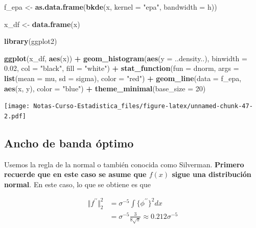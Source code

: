 \documentclass[
  12pt,
]{book}
\newenvironment{Shaded}{\begin{snugshade}}{\end{snugshade}}
\newcommand{\DataTypeTok}[1]{\textcolor[rgb]{0.13,0.29,0.53}{#1}}
\newcommand{\DecValTok}[1]{\textcolor[rgb]{0.00,0.00,0.81}{#1}}
\newcommand{\FloatTok}[1]{\textcolor[rgb]{0.00,0.00,0.81}{#1}}
\newcommand{\KeywordTok}[1]{\textcolor[rgb]{0.13,0.29,0.53}{\textbf{#1}}}
\newcommand{\NormalTok}[1]{#1}
\newcommand{\OperatorTok}[1]{\textcolor[rgb]{0.81,0.36,0.00}{\textbf{#1}}}
\newcommand{\StringTok}[1]{\textcolor[rgb]{0.31,0.60,0.02}{#1}}
\theoremstyle{definition}
\theoremstyle{definition}
\theoremstyle{definition}
\theoremstyle{remark}
\begin{document}
\begin{Shaded}
\begin{Highlighting}[]
\NormalTok{f_epa <-}\StringTok{ }\KeywordTok{as.data.frame}\NormalTok{(}\KeywordTok{bkde}\NormalTok{(x, }\DataTypeTok{kernel =} \StringTok{"epa"}\NormalTok{, }\DataTypeTok{bandwidth =}\NormalTok{ h))}

\NormalTok{x_df <-}\StringTok{ }\KeywordTok{data.frame}\NormalTok{(x)}

\KeywordTok{library}\NormalTok{(ggplot2)}

\KeywordTok{ggplot}\NormalTok{(x_df, }\KeywordTok{aes}\NormalTok{(x)) }\OperatorTok{+}\StringTok{ }\KeywordTok{geom_histogram}\NormalTok{(}\KeywordTok{aes}\NormalTok{(}\DataTypeTok{y =}\NormalTok{ ..density..), }
    \DataTypeTok{binwidth =} \FloatTok{0.02}\NormalTok{, }\DataTypeTok{col =} \StringTok{"black"}\NormalTok{, }\DataTypeTok{fill =} \StringTok{"white"}\NormalTok{) }\OperatorTok{+}\StringTok{ }
\StringTok{    }\KeywordTok{stat_function}\NormalTok{(}\DataTypeTok{fun =}\NormalTok{ dnorm, }\DataTypeTok{args =} \KeywordTok{list}\NormalTok{(}\DataTypeTok{mean =}\NormalTok{ mu, }
        \DataTypeTok{sd =}\NormalTok{ sigma), }\DataTypeTok{color =} \StringTok{"red"}\NormalTok{) }\OperatorTok{+}\StringTok{ }\KeywordTok{geom_line}\NormalTok{(}\DataTypeTok{data =}\NormalTok{ f_epa, }
    \KeywordTok{aes}\NormalTok{(x, y), }\DataTypeTok{color =} \StringTok{"blue"}\NormalTok{) }\OperatorTok{+}\StringTok{ }\KeywordTok{theme_minimal}\NormalTok{(}\DataTypeTok{base_size =} \DecValTok{20}\NormalTok{)}
\end{Highlighting}
\end{Shaded}

\texttt{[image: Notas-Curso-Estadistica\_files/figure-latex/unnamed-chunk-47-2.pdf]}

\hypertarget{ancho-de-banda-uxf3ptimo-1}{%
\subsection{Ancho de banda óptimo}\label{ancho-de-banda-uxf3ptimo-1}}

Usemos la regla de la normal o también conocida como Silverman.
\textbf{Primero recuerde que en este caso se asume que \(f(x)\) sigue una distribución normal}. En este caso, lo que se obtiene es que

\begin{align*}
\Vert f^{\prime \prime} \Vert_2^2 & = \sigma ^{-5} \int \{\phi^{\prime \prime}\}^2 dx              \\
& = \sigma ^{-5} \frac{3}{8\sqrt{\pi}} \approx 0.212 \sigma^{-5}
\end{align*}
\end{document}
